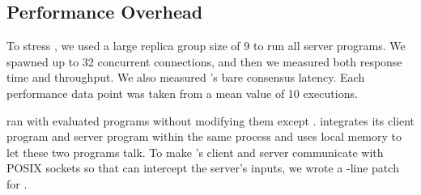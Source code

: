 % 


\subsection{Performance Overhead} \label{sec:overhead}


To stress \xxx, we used a large replica group size of 9 to run all server 
programs. We spawned up to 32 concurrent connections, and then we measured both 
response 
time and throughput. We also measured \xxx's bare consensus latency. Each 
performance data point was taken from a mean value of 
10 executions.


\xxx ran with \nprog evaluated programs without modifying them except
\calvin. \calvin integrates its client program and server program within the
same process and uses local memory to let these two programs talk. To
make \calvin's client and server communicate with POSIX sockets so that \xxx
can intercept the server's inputs, we wrote a \nlinescalvin-line patch for
\calvin.

